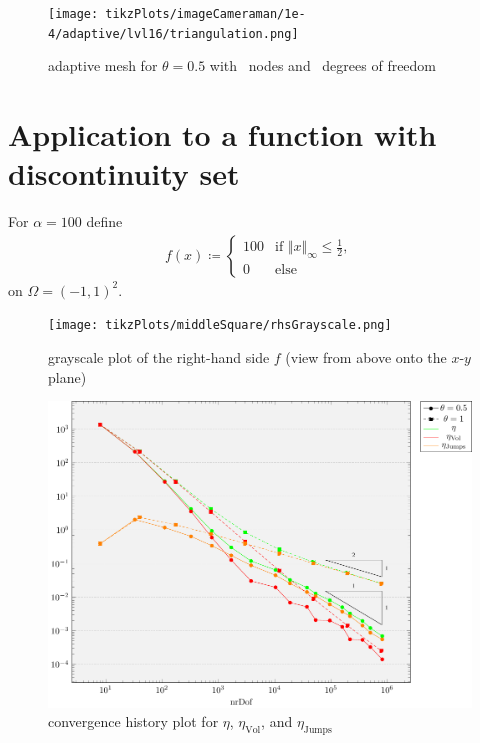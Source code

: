 \documentclass[draft=false,twoside,12pt]{scrreprt}
\begin{document}

\begin{figure}[H]
	\centering
  \texttt{[image: tikzPlots/imageCameraman/1e-4/adaptive/lvl16/triangulation.png]}
  \caption{adaptive mesh for $\theta = 0.5$ with \nrNodes\ nodes and 
  \nrDof\ degrees of freedom}
\end{figure}



\section{Application to a function with discontinuity set}
For $\alpha = 100$ define 
\begin{align}
  \label{equ:defMidSqu}
  f(x)\coloneqq 
  \begin{cases}
    100 &\text{if } \Vert x\Vert_\infty\leq \frac{1}{2},\\
    0 &\text{else}
  \end{cases}
\end{align}
on $\Omega = (-1,1)^2$.

\begin{figure}[H]
	\centering
	\texttt{[image: tikzPlots/middleSquare/rhsGrayscale.png]}
  \caption{grayscale plot of the right-hand side $f$ (view from above onto the
  $x$-$y$ plane)}
  \label{fig:rhsMiddleSquare}
\end{figure}

\begin{figure}[H]
	\centering
	\includegraphics[width=16cm]
  {tikzPlots/middleSquare/convergence.pdf}
  \caption{convergence history plot for $\eta$,
  $\eta_\text{Vol}$, and $\eta_\text{Jumps}$}
\end{figure}
\end{document}
